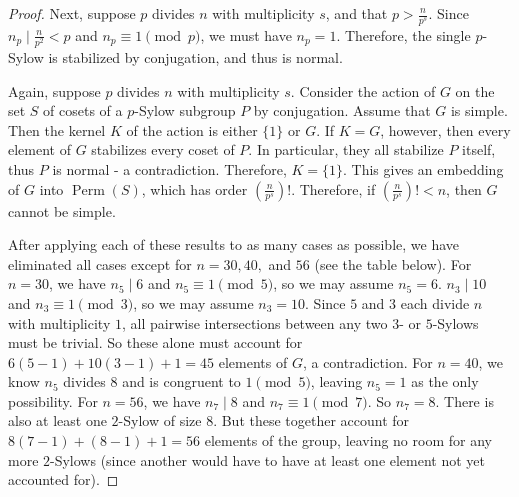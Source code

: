 \documentclass[10pt]{article}
\DeclareMathOperator*{\Perm}{Perm}
\begin{document}
\begin{enumerate}
\begin{proof}
Next, suppose $p$ divides $n$ with multiplicity $s$, and that $p > \frac{n}{p^s}$.  Since $n_p \mid \frac{n}{p^2} < p$ and $n_p \equiv 1 \pmod{p}$, we must have $n_p = 1$.  Therefore, the single $p$-Sylow is stabilized by conjugation, and thus is normal.

Again, suppose $p$ divides $n$ with multiplicity $s$.  Consider the action of $G$ on the set $S$ of cosets of a $p$-Sylow subgroup $P$ by conjugation.  Assume that $G$ is simple.  Then the kernel $K$ of the action is either $\{1\}$ or $G$.  If $K = G$, however, then every element of $G$ stabilizes every coset of $P$.  In particular, they all stabilize $P$ itself, thus $P$ is normal - a contradiction.  Therefore, $K = \{1\}$.  This gives an embedding of $G$ into $\Perm (S)$, which has order $(\frac{n}{p^s})!$.  Therefore, if $(\frac{n}{p^s})! < n$, then $G$ cannot be simple.

After applying each of these results to as many cases as possible, we have eliminated all cases except for $n = 30, 40,$ and $56$ (see the table below).  For $n = 30$, we have $n_5 \mid 6$ and $n_5 \equiv 1 \pmod{5}$, so we may assume $n_5 = 6$.  $n_3 \mid 10$ and $n_3 \equiv 1 \pmod{3}$, so we may assume $n_3 = 10$.  Since $5$ and $3$ each divide $n$ with multiplicity $1$, all pairwise intersections between any two $3$- or $5$-Sylows must be trivial.  So these alone must account for $6(5-1) + 10(3-1) + 1 = 45$ elements of $G$, a contradiction.  For $n = 40$, we know $n_5$ divides $8$ and is congruent to $1 \pmod{5}$, leaving $n_5 = 1$ as the only possibility.  For $n = 56$, we have $n_7 \mid 8$ and $n_7 \equiv 1 \pmod{7}$.  So $n_7 = 8$.  There is also at least one $2$-Sylow of size $8$.  But these together account for $8(7-1) + (8-1) + 1 = 56$ elements of the group, leaving no room for any more $2$-Sylows (since another would have to have at least one element not yet accounted for).

\renewcommand{\arraystretch}{1.2}


\end{proof}
\end{enumerate}
\end{document}
